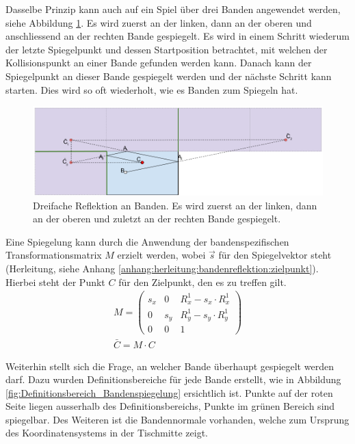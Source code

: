 Dasselbe Prinzip kann auch auf ein Spiel über drei Banden angewendet werden, siehe Abbildung \ref{fig:Dreifache Reflektion an Banden}.
Es wird zuerst an der linken, dann an der oberen und anschliessend an der rechten Bande gespiegelt.
Es wird in einem Schritt wiederum der letzte Spiegelpunkt und dessen Startposition betrachtet, mit welchen der Kollisionspunkt
an einer Bande gefunden werden kann. Danach kann der Spiegelpunkt an dieser Bande gespiegelt werden und der nächste
Schritt kann starten. Dies wird so oft wiederholt, wie es Banden zum Spiegeln hat.
\begin{figure}[h]
    \begin{center}
        \includegraphics[width=1\linewidth]{../common/03_billiard_ai/resources/54_rail_reflection_3.png}
    \end{center}
    \caption{Dreifache Reflektion an Banden. Es wird zuerst an der linken, dann an der oberen und zuletzt an der rechten Bande gespiegelt.}
    \label{fig:Dreifache Reflektion an Banden}
\end{figure}

Eine Spiegelung kann durch die Anwendung der bandenspezifischen Transformationsmatrix $M$ erzielt werden, wobei $\vec{s}$
für den Spiegelvektor steht (Herleitung, siehe Anhang \ref{anhang:herleitung:bandenreflektion:zielpunkt}).
Hierbei steht der Punkt $C$ für den Zielpunkt, den es zu treffen gilt.
\begin{align}
    M = \begin{pmatrix}s_x & 0 & R^1_x - s_x \cdot R^1_x \\ 0 & s_y & R^1_y - s_y \cdot R^1_y \\ 0 & 0 & 1\end{pmatrix}\\
    \bar{C} = M \cdot C
\end{align}

Weiterhin stellt sich die Frage, an welcher Bande überhaupt gespiegelt werden darf.
Dazu wurden Definitionsbereiche für jede Bande erstellt, wie in Abbildung \ref{fig:Definitionsbereich_Bandenspiegelung} ersichtlich ist.
Punkte auf der roten Seite liegen ausserhalb des Definitionsbereichs, Punkte im grünen Bereich sind spiegelbar.
Des Weiteren ist die Bandennormale vorhanden, welche zum Ursprung des Koordinatensystems in der Tischmitte zeigt.

